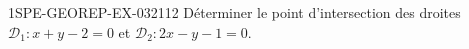 \begin{exercice}{1SPE-GEOREP-EX-032}{1}{12}
Déterminer le point d'intersection des droites $\mathcal{D}_1 : x + y - 2 = 0$ et $\mathcal{D}_2 : 2x - y - 1 = 0$.
\end{exercice}
